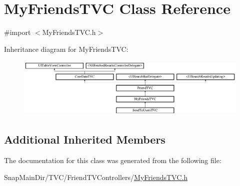 \hypertarget{interface_my_friends_t_v_c}{}\section{My\+Friends\+T\+VC Class Reference}
\label{interface_my_friends_t_v_c}


{\ttfamily \#import $<$My\+Friends\+T\+V\+C.\+h$>$}

Inheritance diagram for My\+Friends\+T\+VC\+:\begin{figure}[H]
\begin{center}
\leavevmode
\includegraphics[height=2.880659cm]{interface_my_friends_t_v_c}
\end{center}
\end{figure}
\subsection*{Additional Inherited Members}


The documentation for this class was generated from the following file\+:\begin{DoxyCompactItemize}
\item 
Snap\+Main\+Dir/\+T\+V\+C/\+Friend\+T\+V\+Controllers/\hyperlink{_my_friends_t_v_c_8h}{My\+Friends\+T\+V\+C.\+h}\end{DoxyCompactItemize}
